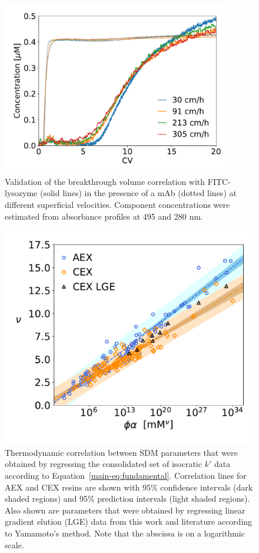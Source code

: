 \documentclass[11pt,a4paper]{article}
\begin{document}
\begin{figure}[bp]
    \centering
    \includegraphics[width=0.9\textwidth]{figure_6}
    \caption{Validation of the breakthrough volume correlation with FITC-lysozyme (solid lines) in the presence of a mAb (dotted lines) at different superficial velocities. Component concentrations were estimated from absorbance profiles at 495 and 280 nm.}
    \label{fig:validation with FITC lysozyme}
\end{figure}


\begin{figure}[htbp]
    \centering
    \includegraphics[width=\textwidth]{figure_7}
    \caption{
    Thermodynamic correlation between SDM parameters that were obtained by regressing the consolidated set of isocratic $k'$ data according to Equation~\ref{main-eq:fundamental}. Correlation lines for AEX and CEX resins are shown with 95\% confidence intervals (dark shaded regions) and 95\% prediction intervals (light shaded regions). Also shown are parameters that were obtained by regressing linear gradient elution (LGE) data from this work and literature according to Yamamoto's method. Note that the abscissa is on a logarithmic scale.
    }
    \label{fig:sdm parameter correlation}
\end{figure}
\end{document}
